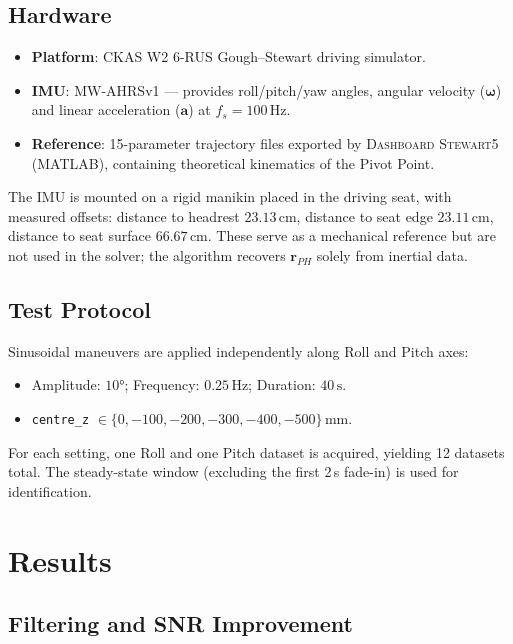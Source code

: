 \documentclass[conference]{IEEEtran}
\newcommand{\vv}[1]{\bm{#1}}          %
\newcommand{\mm}{\,\text{mm}}
\newcommand{\rPH}{\vv{r}_{PH}}
\newcommand{\omg}{\bm{\omega}}
\begin{document}
\subsection{Hardware}

\begin{itemize}
  \item \textbf{Platform}: CKAS W2 6-RUS Gough--Stewart
        driving simulator.
  \item \textbf{IMU}: MW-AHRSv1 — provides roll/pitch/yaw angles,
        angular velocity ($\omg$) and linear acceleration ($\vv{a}$)
        at $f_s = 100\,\mathrm{Hz}$.
  \item \textbf{Reference}: 15-parameter trajectory files exported by
        \textsc{Dashboard Stewart5} (MATLAB), containing theoretical
        kinematics of the Pivot Point.
\end{itemize}

The IMU is mounted on a rigid manikin placed in the driving seat,
with measured offsets:
distance to headrest $23.13\,\text{cm}$,
distance to seat edge $23.11\,\text{cm}$,
distance to seat surface $66.67\,\text{cm}$.
These serve as a mechanical reference but are not used in the solver;
the algorithm recovers $\rPH$ solely from inertial data.

\subsection{Test Protocol}

Sinusoidal maneuvers are applied independently along Roll and Pitch axes:
\begin{itemize}
  \item Amplitude: $10°$; Frequency: $0.25\,\mathrm{Hz}$;
        Duration: $40\,\mathrm{s}$.
  \item \texttt{centre\_z} $\in \{0,-100,-200,-300,-400,-500\}\mm$.
\end{itemize}
For each setting, one Roll and one Pitch dataset is acquired, yielding
12 datasets total.
The steady-state window (excluding the first 2\,s fade-in) is used
for identification.

\section{Results}
\label{sec:results}

\subsection{Filtering and SNR Improvement}
\end{document}
